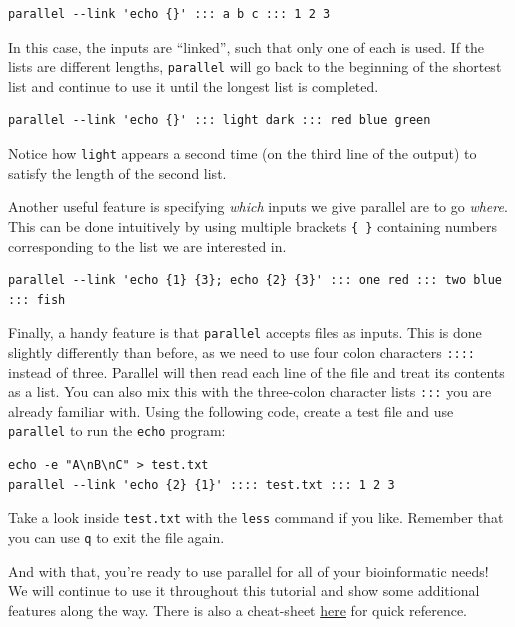 \documentclass[
]{book}
\begin{document}
\begin{verbatim}
parallel --link 'echo {}' ::: a b c ::: 1 2 3
\end{verbatim}

In this case, the inputs are ``linked'', such that only one of each is used. If the lists are different lengths, \texttt{parallel} will go back to the beginning of the shortest list and continue to use it until the longest list is completed.

\begin{verbatim}
parallel --link 'echo {}' ::: light dark ::: red blue green
\end{verbatim}

Notice how \texttt{light} appears a second time (on the third line of the output) to satisfy the length of the second list.

Another useful feature is specifying \emph{which} inputs we give parallel are to go \emph{where}. This can be done intuitively by using multiple brackets \texttt{\{\ \}} containing numbers corresponding to the list we are interested in.

\begin{verbatim}
parallel --link 'echo {1} {3}; echo {2} {3}' ::: one red ::: two blue ::: fish
\end{verbatim}

Finally, a handy feature is that \texttt{parallel} accepts files as inputs. This is done slightly differently than before, as we need to use four colon characters \texttt{::::} instead of three. Parallel will then read each line of the file and treat its contents as a list. You can also mix this with the three-colon character lists \texttt{:::} you are already familiar with. Using the following code, create a test file and use \texttt{parallel} to run the \texttt{echo} program:

\begin{verbatim}
echo -e "A\nB\nC" > test.txt
parallel --link 'echo {2} {1}' :::: test.txt ::: 1 2 3
\end{verbatim}

Take a look inside \texttt{test.txt} with the \texttt{less} command if you like. Remember that you can use \texttt{q} to exit the file again.

And with that, you're ready to use parallel for all of your bioinformatic needs! We will continue to use it throughout this tutorial and show some additional features along the way. There is also a cheat-sheet \href{https://www.gnu.org/software/parallel/parallel_cheat.pdf}{here} for quick reference.
\end{document}
